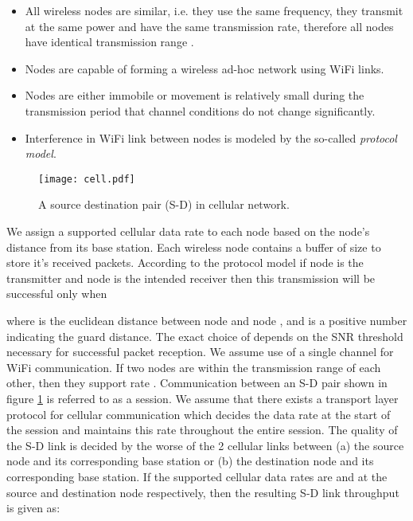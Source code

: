 \documentclass{sig-alternate-10pt}
\begin{document}
\begin{itemize}
  \item All wireless nodes are similar, i.e. they use the same frequency, they transmit at the same power and have the same transmission rate, therefore all nodes have identical transmission range .
  \item Nodes are capable of forming a wireless ad-hoc network using WiFi links.
  \item Nodes are either immobile or movement is relatively small  during the transmission period that channel conditions do not change significantly.
  \item Interference in WiFi link between  nodes is modeled by the so-called \emph{protocol model}.\end{itemize}
\begin{figure}[t]
\begin{center}
\texttt{[image: cell.pdf]}
\end{center}
\caption{A source destination pair (S-D)  in cellular network.}
\label{fig:7cell}
\end{figure}
We assign a supported cellular  data rate  to each node based on the node's distance from its base station. Each wireless node contains a buffer of size  to store it's received packets. According to the protocol model if node  is the transmitter and node  is the intended receiver then this transmission will be successful only when

where  is the euclidean distance between node  and node , and  is a positive number indicating the guard distance. The exact  choice of  depends on the  SNR  threshold necessary for successful packet reception. 
 We assume use of a single channel for WiFi communication. If two nodes are within the transmission range of each other, then they support rate . Communication between an S-D pair  shown in figure \ref{fig:7cell} is referred to as a  session. We assume that  there exists a  transport layer protocol for cellular communication which decides the data rate at the start of the session and maintains this rate throughout the entire session. The quality of the S-D link is decided by the worse of the 2 cellular links between (a) the source node and its corresponding base station or (b) the destination node and its corresponding base station. If the supported cellular data rates are  and   at the source and destination node respectively, then the resulting S-D link throughput is given as:
 

\newpage
\end{document}
